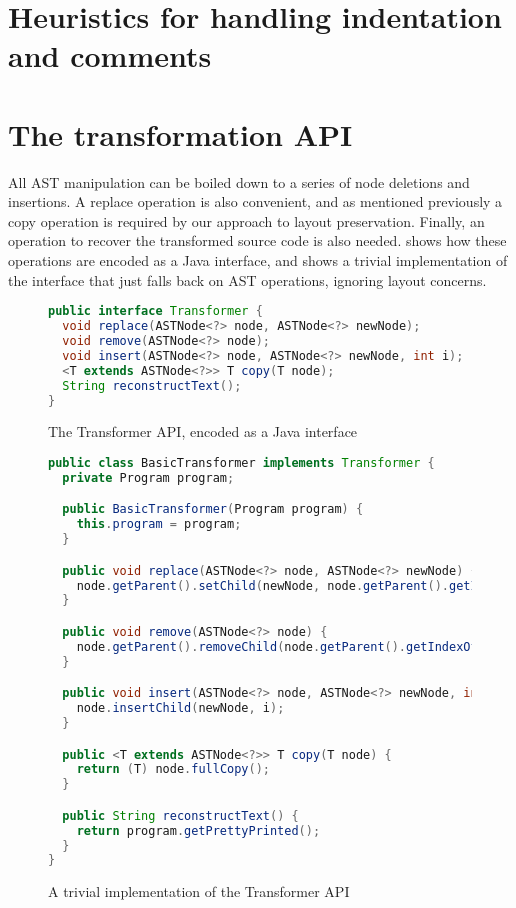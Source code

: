 \section{Heuristics for handling indentation and comments}

\section{The transformation API}

All AST manipulation can be boiled down to a series of node deletions and
insertions.  A replace operation is also convenient, and as mentioned
previously a copy operation is required by our approach to layout preservation.
Finally, an operation to recover the transformed source code is also needed.
 shows how these operations are encoded as a Java
interface, and  shows a trivial implementation of
the interface that just falls back on AST operations, ignoring layout concerns.

\begin{figure}
\begin{lstlisting}[numbers=none, language=Java]
public interface Transformer {
  void replace(ASTNode<?> node, ASTNode<?> newNode);
  void remove(ASTNode<?> node);
  void insert(ASTNode<?> node, ASTNode<?> newNode, int i);
  <T extends ASTNode<?>> T copy(T node);
  String reconstructText();
}
\end{lstlisting}
\caption{The Transformer API, encoded as a Java interface}
\label{Fig:TransformerAPI}
\end{figure}

\begin{figure}
\begin{lstlisting}[numbers=none, language=Java]
public class BasicTransformer implements Transformer {
  private Program program;

  public BasicTransformer(Program program) {
    this.program = program;
  }

  public void replace(ASTNode<?> node, ASTNode<?> newNode) {
    node.getParent().setChild(newNode, node.getParent().getIndexOfChild(node));
  }

  public void remove(ASTNode<?> node) {
    node.getParent().removeChild(node.getParent().getIndexOfChild(node));
  }

  public void insert(ASTNode<?> node, ASTNode<?> newNode, int i) {
    node.insertChild(newNode, i);
  }

  public <T extends ASTNode<?>> T copy(T node) {
    return (T) node.fullCopy();
  }

  public String reconstructText() {
    return program.getPrettyPrinted();
  }
}
\end{lstlisting}
\caption{A trivial implementation of the Transformer API}
\label{Fig:BasicTransformer}
\end{figure}

